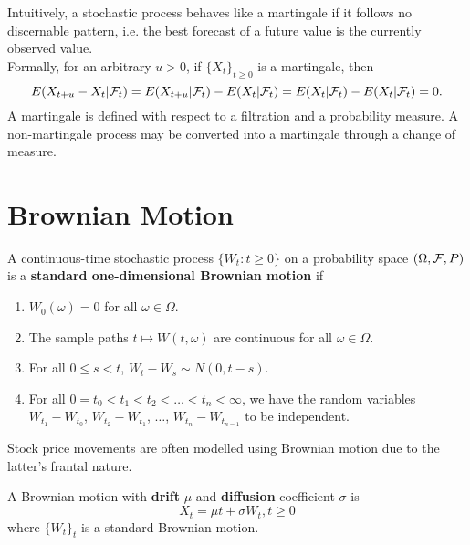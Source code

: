 \documentclass[11pt,fleqn]{book} %
\begin{document}
\begin{remark} \label{rmk:317}
Intuitively, a stochastic process behaves like a martingale if it follows no discernable pattern, i.e. the best forecast of a future value is the currently observed value. \\
\indent Formally, for an arbitrary \(u > 0\), if \(\{X_t\}_{t \geq 0}\) is a martingale, then
\[
E(X_{t + u} - X_t | \mathcal{F}_t) = E(X_{t + u}|\mathcal{F}_t) - E(X_t|\mathcal{F}_t) = E(X_t|\mathcal{F}_t) - E(X_t|\mathcal{F}_t) = 0.
\]
\indent A martingale is defined with respect to a filtration and a probability measure. A non-martingale process may be converted into a martingale through a change of measure.
\end{remark}


\section{Brownian Motion}

\begin{definition} \label{def:321}
A continuous-time stochastic process \(\{W_t: t \geq 0\}\) on a probability space \((\Omega, \mathcal{F}, P)\) is a \textbf{standard one-dimensional Brownian motion} if
\begin{enumerate}
\item \(W_0(\omega) = 0\) for all \(\omega \in \Omega\).
\item The sample paths \(t\mapsto W(t, \omega)\) are continuous for all \(\omega \in \Omega\).
\item For all \(0 \leq s < t\), \(W_t - W_s \sim N(0, t - s)\).
\item For all \(0 = t_0 < t_1 < t_2 < \ldots < t_n < \infty\), we have the random variables \(W_{t_1} - W_{t_0}\), \(W_{t_2} - W_{t_1}\), \(\ldots\), \(W_{t_n} - W_{t_{n - 1}}\) to be independent.
\end{enumerate}
\end{definition}

\begin{remark} \label{rmk:322}
Stock price movements are often modelled using Brownian motion due to the latter's frantal nature.
\end{remark}

\begin{definition} \label{def:323}
A Brownian motion with \textbf{drift} \(\mu\) and \textbf{diffusion} coefficient \(\sigma\) is
\[
X_t = \mu t + \sigma W_t, t \geq 0
\]
where \(\{W_t\}_t\) is a standard Brownian motion.
\end{definition}
\end{document}
